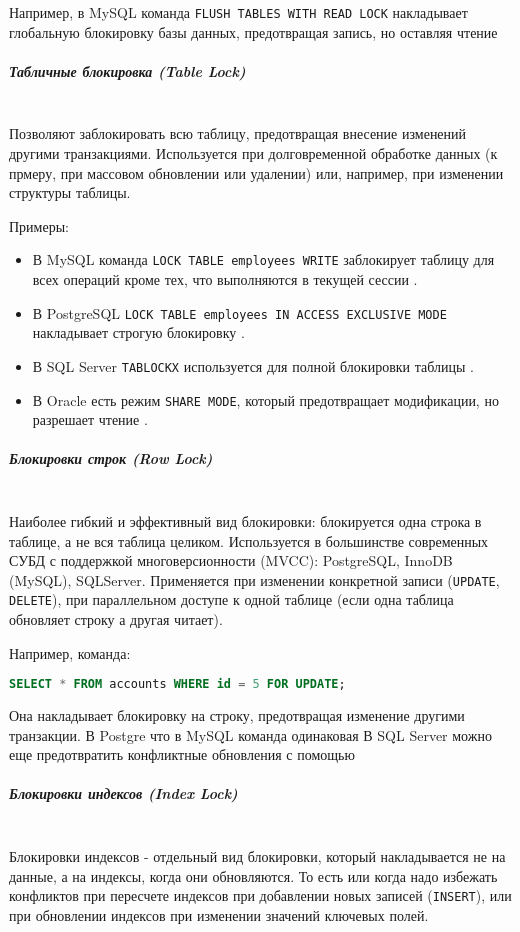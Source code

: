  Например, в MySQL команда \texttt{FLUSH TABLES WITH READ LOCK} накладывает глобальную блокировку базы данных, предотвращая запись, но оставляя чтение \autocite[§15.7.8.3]{Mysqldoc5}
 
 \subparagraph{Табличные блокировка (Table Lock)} ~\\
 Позволяют заблокировать всю таблицу, предотвращая внесение изменений другими транзакциями. Используется при долговременной обработке данных (к прмеру, при массовом обновлении или удалении) или, например, при изменении структуры таблицы.
 
 Примеры:
 \begin{itemize}
     \item В MySQL команда \texttt{LOCK TABLE employees WRITE} заблокирует таблицу для всех операций кроме тех, что выполняются в текущей сессии \autocite[§15.3.6]{Mysqldoc5}.
     \item В PostgreSQL \texttt{LOCK TABLE employees IN ACCESS EXCLUSIVE MODE} накладывает строгую блокировку \autocite{PgReference1}.
     \item В SQL Server \texttt{TABLOCKX} используется для полной блокировки таблицы \autocite{MicrosoftLearnSQLserverTabHints}.
     \item В Oracle есть режим \texttt{SHARE MODE}, который предотвращает модификации, но разрешает чтение \autocite[ch.18]{oracledbreference}.
 \end{itemize}
 
 \subparagraph{Блокировки строк (Row Lock)} ~\\
 Наиболее гибкий и эффективный вид блокировки: блокируется одна строка в таблице, а не вся таблица целиком. Используется в большинстве современных СУБД с поддержкой многоверсионности (MVCC): PostgreSQL, InnoDB (MySQL), SQLServer.
 Применяется при изменении конкретной записи (\texttt{UPDATE}, \texttt{DELETE}), при параллельном доступе к одной таблице (если одна таблица обновляет строку а другая читает).
 
 Например, команда:
 \begin{lstlisting}[language=SQL]
     SELECT * FROM accounts WHERE id = 5 FOR UPDATE;
 \end{lstlisting}
 Она накладывает блокировку на строку, предотвращая изменение другими транзакции. В Postgre что в MySQL команда одинаковая
 В SQL Server можно еще предотвратить конфликтные обновления с помощью \texttt{} \autocite{MicrosoftLearnSQLserverTabHints}
 
 \subparagraph{Блокировки индексов (Index Lock)} ~\\
 Блокировки индексов - отдельный вид блокировки, который накладывается не на данные, а на индексы, когда они обновляются. То есть или когда надо избежать конфликтов при пересчете индексов при добавлении новых записей (\texttt{INSERT}), или при обновлении индексов при изменении значений ключевых полей.
 
